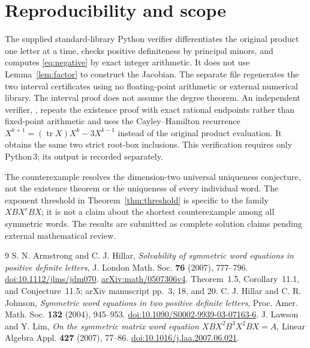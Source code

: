 \documentclass[11pt]{article}
\begin{document}
\section{Reproducibility and scope}
The supplied standard-library Python verifier  differentiates the original product one letter at a time, checks positive definiteness by principal minors, and computes \eqref{eq:negative} by exact integer arithmetic. It does not use Lemma~\ref{lem:factor} to construct the Jacobian. The separate file  regenerates the two interval certificates using no floating-point arithmetic or external numerical library. The interval proof does not assume the degree theorem. An independent verifier, , repeats the existence proof with exact rational endpoints rather than fixed-point arithmetic and uses the Cayley--Hamilton recurrence $X^{k+1}=(\operatorname{tr}X)X^k-3X^{k-1}$ instead of the original product evaluation. It obtains the same two strict root-box inclusions. This verification requires only Python\,3; its output is recorded separately.

The counterexample resolves the dimension-two universal uniqueness conjecture, not the existence theorem or the uniqueness of every individual word. The exponent threshold in Theorem~\ref{thm:threshold} is specific to the family $XBX^rBX$; it is not a claim about the shortest counterexample among all symmetric words. The results are submitted as complete solution claims pending external mathematical review.

\begin{thebibliography}{9}
S. N. Armstrong and C. J. Hillar,
\emph{Solvability of symmetric word equations in positive definite letters},
J. London Math. Soc. \textbf{76} (2007), 777--796.
\href{https://doi.org/10.1112/jlms/jdm070}{doi:10.1112/jlms/jdm070}.
\href{https://arxiv.org/abs/math/0507306}{arXiv:math/0507306v4}.
Theorem~1.5, Corollary~11.1, and Conjecture~11.5; arXiv manuscript pp.~3, 18, and 20.
C. J. Hillar and C. R. Johnson,
\emph{Symmetric word equations in two positive definite letters},
Proc. Amer. Math. Soc. \textbf{132} (2004), 945--953.
\href{https://doi.org/10.1090/S0002-9939-03-07163-6}{doi:10.1090/S0002-9939-03-07163-6}.
J. Lawson and Y. Lim,
\emph{On the symmetric matrix word equation $XBX^2B^3X^2BX=A$},
Linear Algebra Appl. \textbf{427} (2007), 77--86.
\href{https://doi.org/10.1016/j.laa.2007.06.021}{doi:10.1016/j.laa.2007.06.021}.
\end{thebibliography}
\end{document}
